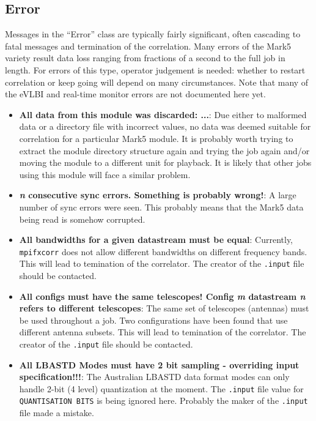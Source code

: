\subsection{Error}

Messages in the ``Error'' class are typically fairly significant, often cascading to fatal messages and termination of the correlation.
Many errors of the Mark5 variety result data loss ranging from fractions of a second to the full job in length.
For errors of this type, operator judgement is needed: whether to restart correlation or keep going will depend on many circumstances.
Note that many of the eVLBI and real-time monitor errors are not documented here yet.

\begin{itemize}

\item {\bf All data from this module was discarded: ...}:
Due either to malformed data or a directory file with incorrect values, no data was deemed suitable for correlation for a particular Mark5 module.
It is probably worth trying to extract the module directory structure again and trying the job again and/or moving the module to a different unit for playback.
It is likely that other jobs using this module will face a similar problem.

\item {\bf {\it n} consecutive sync errors.  Something is probably wrong!}:
A large number of sync errors were seen.
This probably means that the Mark5 data being read is somehow corrupted.

\item {\bf All bandwidths for a given datastream must be equal}:
Currently, {\tt mpifxcorr} does not allow different bandwidths on different frequency bands.
This will lead to temination of the correlator.
The creator of the {\tt .input} file should be contacted.

\item {\bf All configs must have the same telescopes!  Config {\it m} datastream {\it n} refers to different telescopes}:
The same set of telescopes (antennas) must be used throughout a job.
Two configurations have been found that use different antenna subsets.
This will lead to temination of the correlator.
The creator of the {\tt .input} file should be contacted.

\item {\bf All LBASTD Modes must have 2 bit sampling - overriding input specification!!!}:
The Australian LBASTD data format modes can only handle 2-bit (4 level) quantization at the moment.
The {\tt .input} file value for {\tt QUANTISATION BITS} is being ignored here.
Probably the maker of the {\tt .input} file made a mistake.


\end{itemize}
